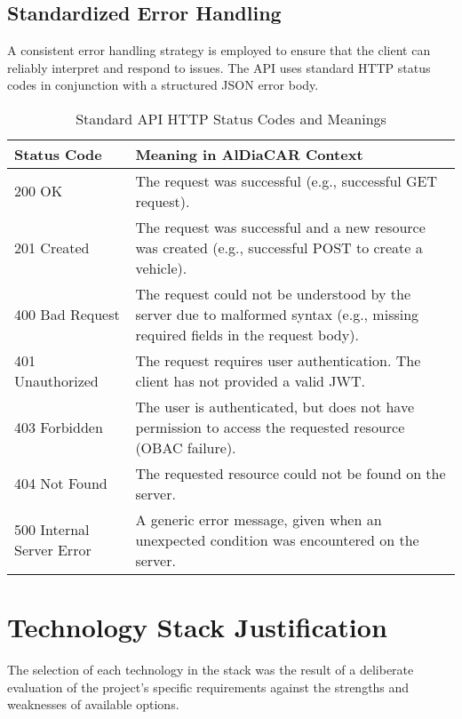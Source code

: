 \subsection{Standardized Error Handling}
A consistent error handling strategy is employed to ensure that the client can reliably interpret and respond to issues. The API uses standard HTTP status codes in conjunction with a structured JSON error body.

\begin{table}[h!]
    \centering
    \caption{Standard API HTTP Status Codes and Meanings}
    \begin{tabular}{l|p{}}
        \hline
        \textbf{Status Code} & \textbf{Meaning in AlDiaCAR Context} \\
        \hline
        200 OK & The request was successful (e.g., successful GET request). \\
        \hline
        201 Created & The request was successful and a new resource was created (e.g., successful POST to create a vehicle). \\
        \hline
        400 Bad Request & The request could not be understood by the server due to malformed syntax (e.g., missing required fields in the request body). \\
        \hline
        401 Unauthorized & The request requires user authentication. The client has not provided a valid JWT. \\
        \hline
        403 Forbidden & The user is authenticated, but does not have permission to access the requested resource (OBAC failure). \\
        \hline
        404 Not Found & The requested resource could not be found on the server. \\
        \hline
        500 Internal Server Error & A generic error message, given when an unexpected condition was encountered on the server. \\
        \hline
    \end{tabular}
\end{table}

\section{Technology Stack Justification}

The selection of each technology in the stack was the result of a deliberate evaluation of the project's specific requirements against the strengths and weaknesses of available options.

